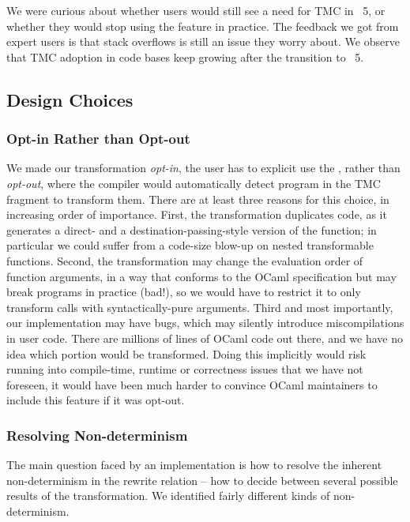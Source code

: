 We were curious about whether users would still see a need for TMC in \OCaml~5, or whether they would stop using the feature in practice.
The feedback we got from expert users is that stack overflows is still an issue they worry about.
We observe that TMC adoption in \OCaml code bases keep growing after the transition to \OCaml~5.

\subsection{Design Choices}
\label{subsec:design-choices}

\subsubsection{Opt-in Rather than Opt-out}\label{subsec:optin}
We made our transformation \emph{opt-in}, the user has to explicit use
the , rather than \emph{opt-out}, where the
compiler would automatically detect program in the TMC fragment to
transform them. There are at least three reasons for this choice, in
increasing order of importance. First, the transformation duplicates
code, as it generates a direct- and a destination-passing-style
version of the function; in particular we could suffer from
a code-size blow-up on nested transformable functions. Second, the
transformation may change the evaluation order of function arguments,
in a way that conforms to the OCaml specification but may break
programs in practice (bad!), so we would have to restrict it to only
transform calls with syntactically-pure arguments. Third and most
importantly, our implementation may have bugs, which may silently
introduce miscompilations in user code. There are millions of lines of
OCaml code out there, and we have no idea which portion would be
transformed. Doing this implicitly would risk running into
compile-time, runtime or correctness issues that we have not foreseen,
it would have been much harder to convince OCaml maintainers to
include this feature if it was opt-out.

\subsubsection{Resolving Non-determinism}

The main question faced by an implementation is how to resolve the
inherent non-determinism in the rewrite relation -- how to decide
between several possible results of the transformation. We identified
fairly different kinds of non-determinism.

